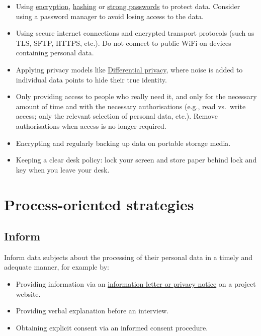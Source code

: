 \documentclass[
]{book}
\providecommand{\tightlist}{%
  \setlength{\itemsep}{0pt}\setlength{\parskip}{0pt}}
\begin{document}
\begin{itemize}
\tightlist
\item
  Using \protect\hyperlink{encryption}{encryption}, \protect\hyperlink{pseudonymisation-anonymisation}{hashing} or
  \href{https://students.uu.nl/en/practical-information/it-facilities/information-security/information-security-secure-access-choosing-a-secure-password}{strong passwords}
  to protect data. Consider using a password manager to avoid losing access to the
  data.
\item
  Using secure internet connections and encrypted transport protocols (such as
  TLS, SFTP, HTTPS, etc.). Do not connect to public WiFi on devices containing
  personal data.
\item
  Applying privacy models like \protect\hyperlink{differential-privacy}{Differential privacy},
  where noise is added to individual data points to hide their true identity.
\item
  Only providing access to people who really need it, and only for the necessary
  amount of time and with the necessary authorisations (e.g., read vs.~write
  access; only the relevant selection of personal data, etc.). Remove
  authorisations when access is no longer required.
\item
  Encrypting and regularly backing up data on portable storage media.
\item
  Keeping a clear desk policy: lock your screen and store paper behind lock and
  key when you leave your desk.
\end{itemize}

\hypertarget{process-oriented-strategies}{%
\section{Process-oriented strategies}\label{process-oriented-strategies}}

\hypertarget{inform}{%
\subsection{Inform}\label{inform}}

Inform data subjects about the processing of their personal data in a timely
and adequate manner, for example by:

\begin{itemize}
\tightlist
\item
  Providing information via an
  \protect\hyperlink{privacy-notices}{information letter or privacy notice} on a project website.
\item
  Providing verbal explanation before an interview.
\item
  Obtaining explicit consent via an informed consent procedure.
\end{itemize}
\end{document}
